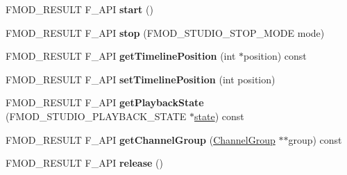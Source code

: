 \begin{DoxyCompactItemize}
\item 
\hypertarget{class_f_m_o_d_1_1_studio_1_1_event_instance_a60147b932233cdd810a0b2f7449d7dae}{F\+M\+O\+D\+\_\+\+R\+E\+S\+U\+L\+T F\+\_\+\+A\+P\+I {\bfseries start} ()}\label{class_f_m_o_d_1_1_studio_1_1_event_instance_a60147b932233cdd810a0b2f7449d7dae}

\item 
\hypertarget{class_f_m_o_d_1_1_studio_1_1_event_instance_a46e1a1bdb3a429bf93dee3fded80703a}{F\+M\+O\+D\+\_\+\+R\+E\+S\+U\+L\+T F\+\_\+\+A\+P\+I {\bfseries stop} (F\+M\+O\+D\+\_\+\+S\+T\+U\+D\+I\+O\+\_\+\+S\+T\+O\+P\+\_\+\+M\+O\+D\+E mode)}\label{class_f_m_o_d_1_1_studio_1_1_event_instance_a46e1a1bdb3a429bf93dee3fded80703a}

\item 
\hypertarget{class_f_m_o_d_1_1_studio_1_1_event_instance_a484f64772a5dd4848482e07f5a736ed2}{F\+M\+O\+D\+\_\+\+R\+E\+S\+U\+L\+T F\+\_\+\+A\+P\+I {\bfseries get\+Timeline\+Position} (int $\ast$position) const }\label{class_f_m_o_d_1_1_studio_1_1_event_instance_a484f64772a5dd4848482e07f5a736ed2}

\item 
\hypertarget{class_f_m_o_d_1_1_studio_1_1_event_instance_a01a36712a315dbfc6a1459aea1160458}{F\+M\+O\+D\+\_\+\+R\+E\+S\+U\+L\+T F\+\_\+\+A\+P\+I {\bfseries set\+Timeline\+Position} (int position)}\label{class_f_m_o_d_1_1_studio_1_1_event_instance_a01a36712a315dbfc6a1459aea1160458}

\item 
\hypertarget{class_f_m_o_d_1_1_studio_1_1_event_instance_a441840f83e772c20ecd663245c511cb9}{F\+M\+O\+D\+\_\+\+R\+E\+S\+U\+L\+T F\+\_\+\+A\+P\+I {\bfseries get\+Playback\+State} (F\+M\+O\+D\+\_\+\+S\+T\+U\+D\+I\+O\+\_\+\+P\+L\+A\+Y\+B\+A\+C\+K\+\_\+\+S\+T\+A\+T\+E $\ast$\hyperlink{structstate}{state}) const }\label{class_f_m_o_d_1_1_studio_1_1_event_instance_a441840f83e772c20ecd663245c511cb9}

\item 
\hypertarget{class_f_m_o_d_1_1_studio_1_1_event_instance_a7d59d7281cb728035453b28d6ff74f26}{F\+M\+O\+D\+\_\+\+R\+E\+S\+U\+L\+T F\+\_\+\+A\+P\+I {\bfseries get\+Channel\+Group} (\hyperlink{class_f_m_o_d_1_1_channel_group}{Channel\+Group} $\ast$$\ast$group) const }\label{class_f_m_o_d_1_1_studio_1_1_event_instance_a7d59d7281cb728035453b28d6ff74f26}

\item 
\hypertarget{class_f_m_o_d_1_1_studio_1_1_event_instance_a01ea7def87339c537719145ac1b1dc67}{F\+M\+O\+D\+\_\+\+R\+E\+S\+U\+L\+T F\+\_\+\+A\+P\+I {\bfseries release} ()}\label{class_f_m_o_d_1_1_studio_1_1_event_instance_a01ea7def87339c537719145ac1b1dc67}


\end{DoxyCompactItemize}
